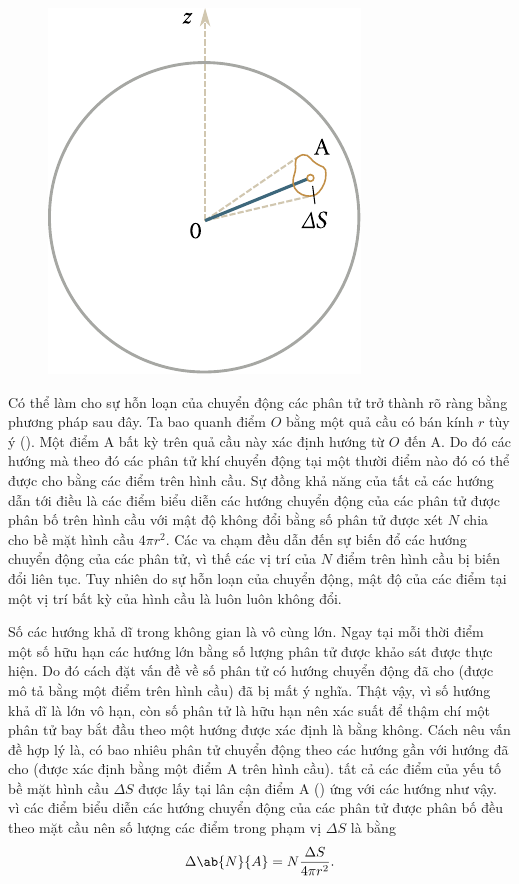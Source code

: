 \begin{figure}[!htb]
	\begin{center}
		\includegraphics[scale=0.95]{figures/ch_11/fig_11_2.pdf}
		\caption[]{}
		\label{fig:11_2}
	\end{center}
	\vspace{-0.8cm}
\end{figure}

Có thể làm cho sự hỗn loạn của chuyển động các phân tử trở thành rõ ràng bằng phương pháp sau đây. Ta bao quanh điểm $O$ bằng một quả cầu có bán kính $r$ tùy ý (). Một điểm A bất kỳ trên quả cầu này xác định hướng từ $O$ đến A. Do đó các hướng mà theo đó các phân tử khí chuyển động tại một thười điểm nào đó có thể được cho bằng các điểm trên hình cầu. Sự đồng khả năng của tất cả các hướng dẫn tới điều là các điểm biểu diễn các hướng chuyển động của các phân tử được phân bố trên hình cầu với mật độ không đổi bằng số phân tử được xét $N$ chia cho bề mặt hình cầu $4\pi r^2$. Các va chạm đều dẫn đến sự biến đổ các hướng chuyển động của các phân tử, vì thế các vị trí của $N$ điểm trên hình cầu bị biến đổi liên tục. Tuy nhiên do sự hỗn loạn của chuyển động, mật độ của các điểm tại một vị trí bất kỳ của hình cầu là luôn luôn không đổi. 

Số các hướng khả dĩ trong không gian là vô cùng lớn. Ngay tại mỗi thời điểm một số hữu hạn các hướng lớn bằng số lượng phân tử được khảo sát được thực hiện. Do đó cách đặt vấn đề về số phân tử có hướng chuyển động đã cho (được mô tả bằng một điểm trên hình cầu) đã bị mất ý nghĩa. Thật vậy, vì số hướng khả dĩ là lớn vô hạn, còn số phân tử là hữu hạn nên xác suất để thậm chí một phân tử bay bắt đầu theo một hướng được xác định là bằng không. Cách nêu vấn đề hợp lý là, có bao nhiêu phân tử chuyển động theo các hướng gần với hướng đã cho (được xác định bằng một điểm A trên hình cầu). tất cả các điểm của yếu tố bề mặt hình cầu $\Delta S$ được lấy tại lân cận điểm A () ứng với các hướng như vậy. vì các điểm biểu diễn các hướng chuyển động của các phân tử được phân bố đều theo mặt cầu nên số lượng các điểm trong phạm vị $\Delta S$ là bằng
\begin{equation}\label{eq:11_12}
	\Delta \ab{N}{A} = N\frac{\Delta S}{4\pi r^2}.
\end{equation}

